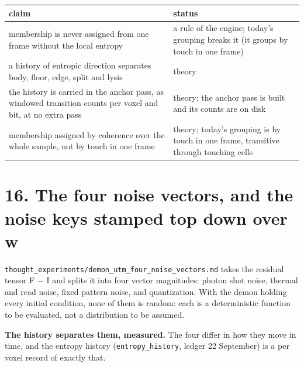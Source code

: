{\small
\setlength{\tabcolsep}{6pt}
\begin{longtable}{>{\RaggedRight\arraybackslash}p{}>{\RaggedRight\arraybackslash}p{}}
\toprule
claim & status \\
\midrule
\endhead
membership is never assigned from one frame without the local entropy & a rule of the engine; today's grouping breaks it (it groups by touch in one frame) \\
a history of entropic direction separates body, floor, edge, split and lysis & theory \\
the history is carried in the anchor pass, as windowed transition counts per voxel and bit, at no extra pass & theory; the anchor pass is built and its counts are on disk \\
membership assigned by coherence over the whole sample, not by touch in one frame & theory; today's grouping is by touch in one frame, transitive through touching cells \\
\bottomrule
\end{longtable}
}

\section{\texorpdfstring{16. The four noise vectors, and the noise keys stamped top down over w}{16. The four noise vectors, and the noise keys stamped top down over w}}

\texttt{thought\_\allowbreak{}experiments/\allowbreak{}demon\_\allowbreak{}utm\_\allowbreak{}four\_\allowbreak{}noise\_\allowbreak{}vectors.\allowbreak{}md} takes the residual tensor F − I and splits it into four vector magnitudes: photon shot noise, thermal and read noise, fixed pattern noise, and quantization. With the demon holding every initial condition, none of them is random: each is a deterministic function to be evaluated, not a distribution to be assumed.

\textbf{The history separates them, measured.} The four differ in how they move in time, and the entropy history (\texttt{entropy\_\allowbreak{}history}, ledger 22 September) is a per voxel record of exactly that.

